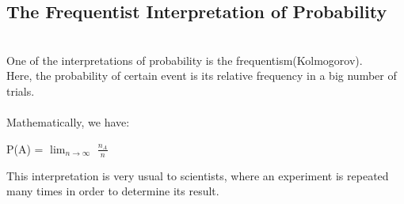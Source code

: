 \documentclass[oneside]{book}
\begin{document}
\subsection{The Frequentist Interpretation of Probability}
\\
One of the interpretations of probability is the frequentism(Kolmogorov).\\ Here, the probability of certain event is its relative frequency in a big number of trials. \\\\ Mathematically, we have:
\begin{center}
P(A) = $\lim_{n\rightarrow \infty}$ $\frac{n_A}{n}$

\end{center}
\vspace*{0.2}This interpretation is very usual to scientists, where an experiment is repeated many times in order to determine its result.
\end{document}
